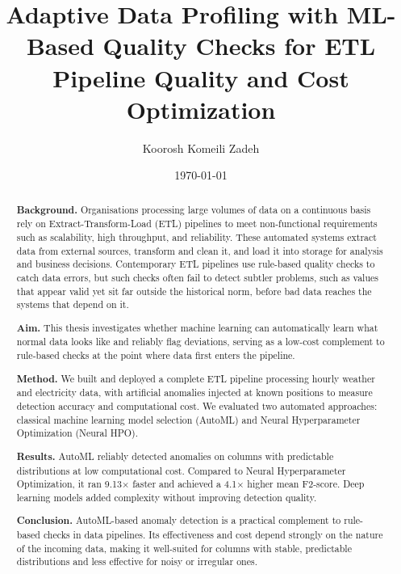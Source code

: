 \documentclass[12pt]{article}
\title{Adaptive Data Profiling with ML-Based Quality Checks for ETL Pipeline Quality and Cost Optimization}
\author{Koorosh Komeili Zadeh}
\date{\today}
\begin{document}
\hypersetup{pageanchor=false}
\maketitle
\hypersetup{pageanchor=true}

\thispagestyle{empty}
\begin{abstract}
\noindent
\textbf{Background.} Organisations processing large volumes of data on a continuous basis rely on Extract-Transform-Load (ETL) pipelines to meet non-functional requirements such as scalability, high throughput, and reliability. These automated systems extract data from external sources, transform and clean it, and load it into storage for analysis and business decisions. Contemporary ETL pipelines use rule-based quality checks to catch data errors, but such checks often fail to detect subtler problems, such as values that appear valid yet sit far outside the historical norm, before bad data reaches the systems that depend on it.

\noindent
\textbf{Aim.} This thesis investigates whether machine learning can automatically learn what normal data looks like and reliably flag deviations, serving as a low-cost complement to rule-based checks at the point where data first enters the pipeline.

\noindent
\textbf{Method.} We built and deployed a complete ETL pipeline processing hourly weather and electricity data, with artificial anomalies injected at known positions to measure detection accuracy and computational cost. We evaluated two automated approaches: classical machine learning model selection (AutoML) and Neural Hyperparameter Optimization (Neural HPO).

\noindent
\textbf{Results.} AutoML reliably detected anomalies on columns with predictable distributions at low computational cost. Compared to Neural Hyperparameter Optimization, it ran 9.13$\times$ faster and achieved a 4.1$\times$ higher mean F2-score. Deep learning models added complexity without improving detection quality.

\noindent
\textbf{Conclusion.} AutoML-based anomaly detection is a practical complement to rule-based checks in data pipelines. Its effectiveness and cost depend strongly on the nature of the incoming data, making it well-suited for columns with stable, predictable distributions and less effective for noisy or irregular ones.
\end{abstract}


\newpage
\thispagestyle{empty}
\tableofcontents
\thispagestyle{empty}
\clearpage
{}
\end{document}
